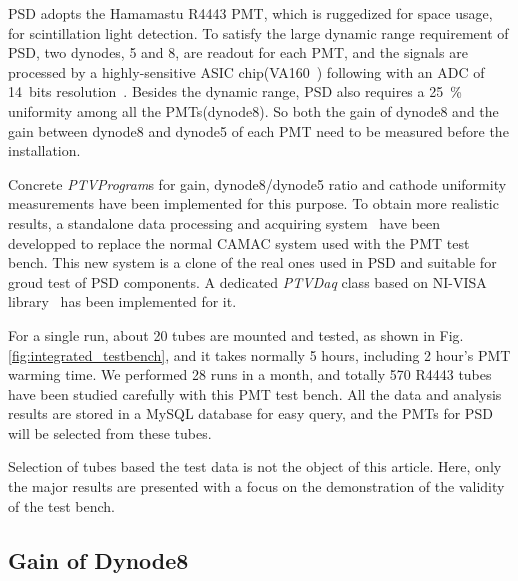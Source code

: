 \documentclass[5p, times]{elsarticle}
\begin{document}
PSD adopts the Hamamastu R4443 PMT, which is ruggedized for space usage, for scintillation light detection. 
To satisfy the large dynamic range requirement of PSD, two dynodes, 5 and 8, are readout for each PMT, and the signals are processed by a highly-sensitive ASIC chip(VA160~\cite{va160}) following with an ADC of 14~bits resolution~\cite{fee}. 
Besides the dynamic range, PSD also requires a \SI{25}{\percent} uniformity among all the PMTs(dynode8).%
So both the gain of dynode8 and the gain between dynode8 and dynode5 of each PMT need to be measured before the installation.

Concrete \textit{PTVProgram}s for gain, dynode8/dynode5 ratio and cathode uniformity measurements have been implemented for this purpose.
To obtain more realistic results, a standalone data processing and acquiring system~\cite{fee} have been developped to replace the normal CAMAC system used with the PMT test bench. 
This new system is a clone of the real ones used in PSD and suitable for groud test of PSD components.
A dedicated \textit{PTVDaq} class based on NI-VISA library~\cite{ni_visa} has been implemented for it.

For a single run, about 20 tubes are mounted and tested, as shown in Fig.\ref{fig:integrated_testbench}, and it takes normally 5 hours, including 2 hour's PMT warming time. 
We performed 28 runs in a month, and totally 570 R4443 tubes have been studied carefully with this PMT test bench. 
All the data and analysis results are stored in a MySQL database for easy query, and the PMTs for PSD will be selected from these tubes.

Selection of tubes based the test data is not the object of this article.
Here, only the major results are presented with a focus on the demonstration of the validity of the test bench. 

\subsection{Gain of Dynode8}
\label{sec:psd_gain}
\end{document}
